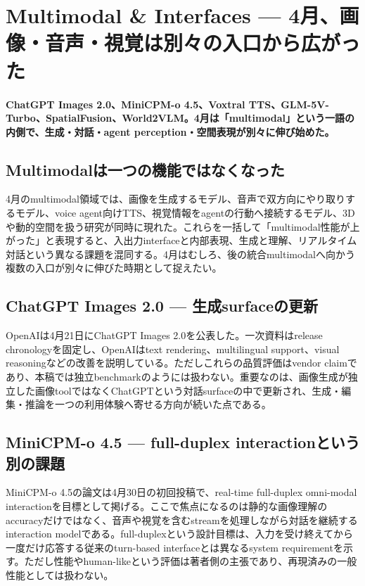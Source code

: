 \section{Multimodal \& Interfaces — 4月、画像・音声・視覚は別々の入口から広がった}
\label{pkg:multimodal-interfaces-april}
\noindent\textbf{ChatGPT Images 2.0、MiniCPM-o 4.5、Voxtral TTS、GLM-5V-Turbo、SpatialFusion、World2VLM。4月は「multimodal」という一語の内側で、生成・対話・agent perception・空間表現が別々に伸び始めた。}\autocite{src-0f697d747d9c,src-d113b486a585,src-d33ba68aac3c,src-d8b7c1c36830}

\subsection{Multimodalは一つの機能ではなくなった}

4月のmultimodal領域では、画像を生成するモデル、音声で双方向にやり取りするモデル、voice agent向けTTS、視覚情報をagentの行動へ接続するモデル、3Dや動的空間を扱う研究が同時に現れた。これらを一括して「multimodal性能が上がった」と表現すると、入出力interfaceと内部表現、生成と理解、リアルタイム対話という異なる課題を混同する。4月はむしろ、後の統合multimodalへ向かう複数の入口が別々に伸びた時期として捉えたい。\autocite{src-0f697d747d9c,src-3fa7f7c1140f,src-d113b486a585,src-d33ba68aac3c,src-d8b7c1c36830,src-fec81b98fdc8}


\subsection{ChatGPT Images 2.0 — 生成surfaceの更新}

OpenAIは4月21日にChatGPT Images 2.0を公表した。一次資料はrelease chronologyを固定し、OpenAIはtext rendering、multilingual support、visual reasoningなどの改善を説明している。ただしこれらの品質評価はvendor claimであり、本稿では独立benchmarkのようには扱わない。重要なのは、画像生成が独立した画像toolではなくChatGPTという対話surfaceの中で更新され、生成・編集・推論を一つの利用体験へ寄せる方向が続いた点である。\autocite{src-0f697d747d9c}


\subsection{MiniCPM-o 4.5 — full-duplex interactionという別の課題}

MiniCPM-o 4.5の論文は4月30日の初回投稿で、real-time full-duplex omni-modal interactionを目標として掲げる。ここで焦点になるのは静的な画像理解のaccuracyだけではなく、音声や視覚を含むstreamを処理しながら対話を継続するinteraction modelである。full-duplexという設計目標は、入力を受け終えてから一度だけ応答する従来のturn-based interfaceとは異なるsystem requirementを示す。ただし性能やhuman-likeという評価は著者側の主張であり、再現済みの一般性能としては扱わない。\autocite{src-d33ba68aac3c}


